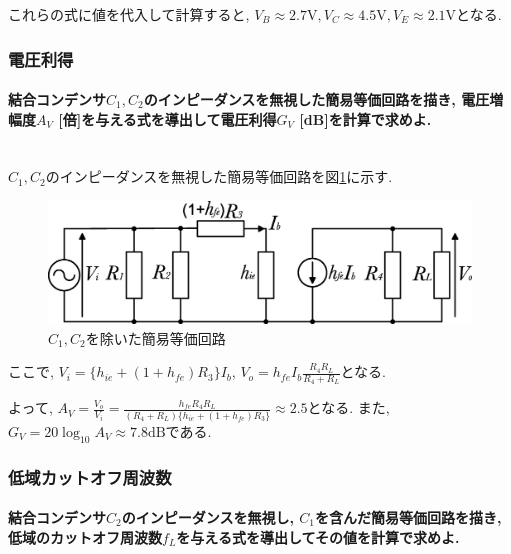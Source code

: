 \documentclass[titlepage]{jsarticle}
\begin{document}
                これらの式に値を代入して計算すると,
                $V_B \approx 2.7 \mathrm{V}, V_C \approx 4.5 \mathrm{V}, V_E \approx 2.1 \mathrm{V}$となる.

        \subsubsection{電圧利得} \label{sssec:gv}
            \paragraph{結合コンデンサ$C_1, C_2$のインピーダンスを無視した簡易等価回路を描き, 電圧増幅度$A_V$ [倍]を与える式を導出して電圧利得$G_V$ [dB]を計算で求めよ.}
            \mbox{} \\

                $C_1, C_2$のインピーダンスを無視した簡易等価回路を図\ref{fig:touka}に示す.

                \begin{figure}[h]
                    \centering
                    \includegraphics[width=1\hsize]{images/touka.eps}
                    \caption{$C_1, C_2$を除いた簡易等価回路}
                    \label{fig:touka}
                \end{figure}

                ここで, $V_i = \{h_{ie} + \left(1 + h_{fe}\right) R_3\}I_b$,
                $\displaystyle V_o = h_{fe}I_b\frac{R_4R_L}{R_4 + R_L}$となる.

                よって, $\displaystyle A_V = \frac{V_o}{V_i} = \frac{h_{fe}R_4R_L}{(R_4 + R_L)\{h_{ie} + (1 + h_{fe}) R_3\}} \approx 2.5$となる.
                また, $G_V = 20 \log_{10}{A_V} \approx 7.8 \mathrm{dB}$である.

        \subsubsection{低域カットオフ周波数} \label{sssec:cutoff}
            \paragraph{結合コンデンサ$C_2$のインピーダンスを無視し, $C_1$を含んだ簡易等価回路を描き, 低域のカットオフ周波数$f_L$を与える式を導出してその値を計算で求めよ.}
            \mbox{} \\
\end{document}
